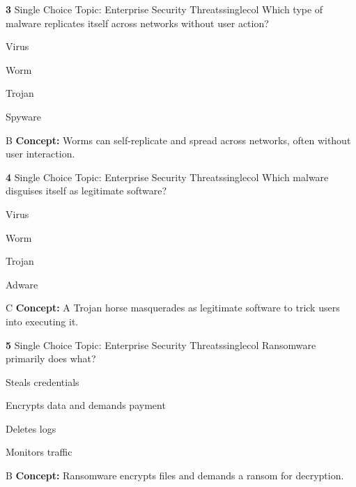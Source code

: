 \documentclass[10pt,a4paper]{article}
\begin{document}
\begin{qcard}{\color{white}\textbf{3} \hfill \small Single Choice \textbar{} Topic: Enterprise Security Threats}{singlecol}
Which type of malware replicates itself across networks without user action?

\begin{qoptions}
\item Virus
\item Worm
\item Trojan
\item Spyware
\end{qoptions}
\begin{explainbox}{B}
\textbf{Concept:} Worms can self-replicate and spread across networks, often without user interaction.
\end{explainbox}
\end{qcard}

\begin{qcard}{\color{white}\textbf{4} \hfill \small Single Choice \textbar{} Topic: Enterprise Security Threats}{singlecol}
Which malware disguises itself as legitimate software?

\begin{qoptions}
\item Virus
\item Worm
\item Trojan
\item Adware
\end{qoptions}
\begin{explainbox}{C}
\textbf{Concept:} A Trojan horse masquerades as legitimate software to trick users into executing it.
\end{explainbox}
\end{qcard}

\begin{qcard}{\color{white}\textbf{5} \hfill \small Single Choice \textbar{} Topic: Enterprise Security Threats}{singlecol}
Ransomware primarily does what?

\begin{qoptions}
\item Steals credentials
\item Encrypts data and demands payment
\item Deletes logs
\item Monitors traffic
\end{qoptions}
\begin{explainbox}{B}
\textbf{Concept:} Ransomware encrypts files and demands a ransom for decryption.
\end{explainbox}
\end{qcard}
\end{document}
